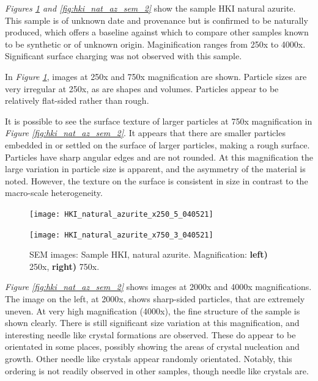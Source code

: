 \textit{Figures \ref{fig:hki_nat_az_sem_1} and \ref{fig:hki_nat_az_sem_2}} show the sample HKI natural azurite. This sample is of unknown date and provenance but is confirmed to be naturally produced, which offers a baseline against which to compare other samples known to be synthetic or of unknown origin. Maginification ranges from 250x to 4000x. Significant surface charging was not observed with this sample.

In \textit{Figure \ref{fig:hki_nat_az_sem_1}}, images at 250x and 750x magnification are shown. Particle sizes are very irregular at 250x, as are shapes and volumes. Particles appear to be relatively flat-sided rather than rough. 

It is possible to see the surface texture of larger particles at 750x magnification in \textit{Figure \ref{fig:hki_nat_az_sem_2}}. It appears that there are smaller particles embedded in or settled on the surface of larger particles, making a rough surface. Particles have sharp angular edges and are not rounded. At this magnification the large variation in particle size is apparent, and the asymmetry of the material is noted. However, the texture on the surface is consistent in size in contrast to the macro-scale heterogeneity.

\begin{figure}[H]
\centering
\begin{minipage}{.45\textwidth}
  \centering
  \texttt{[image: HKI\_natural\_azurite\_x250\_5\_040521]}
\end{minipage}
\begin{minipage}{.45\textwidth}
  \centering
  \texttt{[image: HKI\_natural\_azurite\_x750\_3\_040521]}
\end{minipage}
\caption[SEM images: Sample HKI, natural azurite]{SEM images: Sample HKI, natural azurite. Magnification: \textbf{left)} 250x, \textbf{right)} 750x.}
\label{fig:hki_nat_az_sem_1}
\end{figure}

\textit{Figure \ref{fig:hki_nat_az_sem_2}} shows images at 2000x and 4000x magnifications. The image on the left, at 2000x, shows sharp-sided particles, that are extremely uneven. At very high magnification (4000x), the fine structure of the sample is shown clearly. There is still significant size variation at this magnification, and interesting needle like crystal formations are observed. These do appear to be orientated in some places, possibly showing the areas of crystal nucleation and growth. Other needle like crystals appear randomly orientated. Notably, this ordering is not readily observed in other samples, though needle like crystals are.

